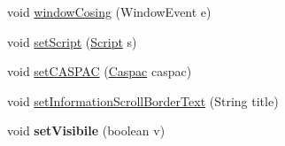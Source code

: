 \begin{DoxyCompactItemize}
\item 
void \hyperlink{classGUI_1_1development_1_1CASUALJFrameMain_ad2838f5ac8ff377c58a8423f3eae1be6}{window\-Cosing} (Window\-Event e)
\item 
void \hyperlink{classGUI_1_1development_1_1CASUALJFrameMain_a5c63c8abc79e383d5ebf1d38c4dfcd13}{set\-Script} (\hyperlink{classCASUAL_1_1caspac_1_1Script}{Script} s)
\item 
void \hyperlink{classGUI_1_1development_1_1CASUALJFrameMain_ae49b006965b1e155a86c6c8c7aec1ecb}{set\-C\-A\-S\-P\-A\-C} (\hyperlink{classCASUAL_1_1caspac_1_1Caspac}{Caspac} caspac)
\item 
void \hyperlink{classGUI_1_1development_1_1CASUALJFrameMain_aa715222603235cd4c0e10ccf8ec35c64}{set\-Information\-Scroll\-Border\-Text} (String title)
\item 
\hypertarget{classGUI_1_1development_1_1CASUALJFrameMain_a96d8372cafb7676437d70cd9e8167f7e}{void {\bfseries set\-Visibile} (boolean v)}\label{classGUI_1_1development_1_1CASUALJFrameMain_a96d8372cafb7676437d70cd9e8167f7e}


\end{DoxyCompactItemize}
